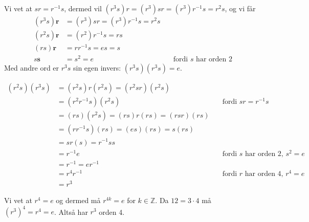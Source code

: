 \documentclass[a4paper,norsk,12pt]{article}
\begin{document}
Vi vet at $sr=r^{-1}s$, dermed vil $(r^3s)r = (r^3)sr = (r^3)r^{-1}s = r^2s$,
og vi får
\begin{align*}
  (r^3s)\mathbf{r} &= (r^3)sr = (r^3)r^{-1}s = r^2s \\
  (r^2s)\mathbf{r} &= (r^2)r^{-1}s = rs \\
  (rs)\mathbf{r} &= rr^{-1}s = es = s \\
  s\mathbf{s} &= s^2 = e & \quad\text{fordi $s$ har orden 2}
\end{align*}
Med andre ord er $r^3s$ sin egen invers: $(r^3s)(r^3s) = e$.

\begin{align*}
  (r^2s)(r^3s) &= (r^2s)r(r^2s) = (r^2sr)(r^2s) \\
               &= (r^2r^{-1}s)(r^2s)  & \quad\text{fordi } sr=r^{-1}s \\
               &= (rs)(r^2s) = (rs)r(rs) = (rsr)(rs) \\
               &= (rr^{-1}s)(rs) = (es)(rs) = s(rs) \\
               &= sr(s) = r^{-1}ss \\
               &= r^{-1}e & \quad\text{fordi $s$ har orden 2, } s^2=e \\
               &= r^{-1} = er^{-1} \\
               &= r^4r^{-1} & \quad\text{fordi $r$ har orden 4, } r^4=e \\
               &= r^3
\end{align*}

Vi vet at $r^4=e$ og dermed må $r^{4k}=e$ for $k\in\mathbb{Z}$. Da $12 = 3\cdot4$ må
$(r^3)^4=r^4=e$. Altså har $r^3$ orden 4.

\end{document}
